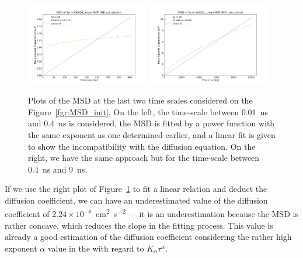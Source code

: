 \documentclass[main]{subfiles}
\begin{document}
\begin{figure}[ht]
  \centering
\includegraphics[width=0.48\textwidth]{figures/5-diffusion/MSD_Xe_coeff_KAXQIL_clean_1.pdf}
\includegraphics[width=0.48\textwidth]{figures/5-diffusion/MSD_Xe_coeff_KAXQIL_clean_2.pdf}
\caption{ Plots of the MSD at the last two time scales considered on the Figure~\ref{fgr:MSD_init}. On the left, the time-scale between \SI{0.01}{\ns} and \SI{0.4}{\ns} is considered, the MSD is fitted by a power function with the same exponent as one determined earlier, and a linear fit is given to show the incompatibility with the diffusion equation. On the right, we have the same approach but for the time-scale between \SI{0.4}{\ns} and \SI{9}{\ns}. }\label{fgr:MSD_linear_init}
\end{figure}

If we use the right plot of Figure~\ref{fgr:MSD_linear_init} to fit a linear relation and deduct the diffusion coefficient, we can have an underestimated value of the diffusion coefficient of $2.24\times 10^{-8}$~\si{\square\cm\per\square\s} --- it is an underestimation because the MSD is rather concave, which reduces the slope in the fitting process. This value is already a good estimation of the diffusion coefficient considering the rather high exponent $\alpha$ value in the with regard to $K_\alpha\tau^\alpha$.
\end{document}
